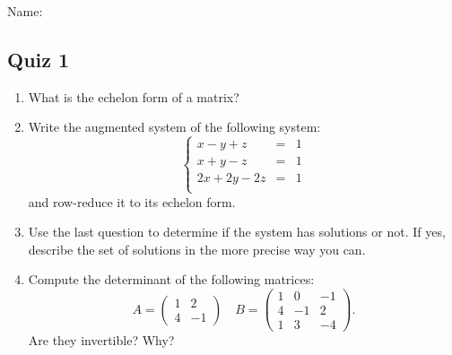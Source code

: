 Name:\\

\begin{center}\section*{Quiz 1}\end{center}

\vskip 0.5in
\begin{enumerate}
\item What is the echelon form of a matrix?
\item Write the augmented system of the following system:
\[ \left\{ 
\begin{array}{ccc} 
x - y + z & = & 1 \\
x +y -z & = & 1 \\
2x+ 2y -2z & = & 1 \\
\end{array}
\right.
\]
and row-reduce it to its echelon form.
\item Use the last question to determine if the system has solutions or not. If yes, describe the set of solutions in the more precise way you can.
\item Compute the determinant of the following matrices:
\[A= \begin{pmatrix}
1 & 2 \\ 4 & -1\end{pmatrix}
\quad 
B= \begin{pmatrix}
1 & 0 &  -1 \\ 4 & -1 & 2 \\ 1 & 3 & -4\end{pmatrix}.\]
Are they invertible? Why?
\end{enumerate}
